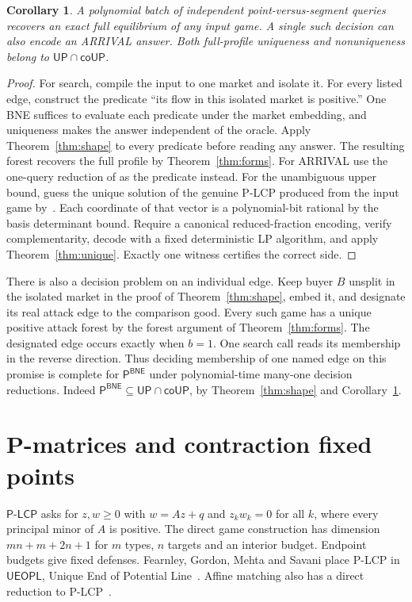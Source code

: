 \documentclass[11pt,oneside,openany,notitlepage]{report}
\newtheorem{corollary}[theorem]{Corollary}
\newcommand{\BNE}{\mathsf{BNE}}
\newcommand{\PLCP}{\mathsf{P\mbox{-}LCP}}
\begin{document}
\begin{corollary}\label{cor:batch}
A polynomial batch of independent point-versus-segment queries recovers
an exact full equilibrium of any input game. A single such decision can
also encode an ARRIVAL answer. Both full-profile uniqueness and
nonuniqueness belong to \(\mathsf{UP}\cap\mathsf{coUP}\).
\end{corollary}
\begin{proof}
For search, compile the input to one market and isolate it. For every
listed edge, construct the predicate ``its flow in this isolated market
is positive.'' One BNE suffices to evaluate each predicate under the
market embedding, and uniqueness makes the answer independent of the
oracle. Apply Theorem~\ref{thm:shape} to every predicate before reading
any answer. The resulting forest recovers the full profile by
Theorem~\ref{thm:forms}. For ARRIVAL use the one-query reduction of
\cite[Theorem~4.1]{book} as the predicate instead. For the unambiguous
upper bound, guess the unique solution of the genuine P-LCP produced
from the input game by~\cite[Theorem~5.19]{book}. Each coordinate of that
vector is a polynomial-bit rational by the basis determinant bound.
Require a canonical reduced-fraction encoding, verify complementarity,
decode with a fixed deterministic LP algorithm, and apply
Theorem~\ref{thm:unique}. Exactly one witness certifies the correct side.
\end{proof}

There is also a decision problem on an individual edge. Keep buyer \(B\)
unsplit in the isolated market in the proof of Theorem~\ref{thm:shape},
embed it, and designate its real attack edge to the comparison good.
Every such game has a unique positive attack forest by the forest argument
of Theorem~\ref{thm:forms}. The designated edge occurs exactly when
\(b=1\). One search call reads its membership in the reverse direction.
Thus deciding membership of one named edge on this promise is complete
for \(\mathsf P^{\BNE}\) under polynomial-time many-one decision reductions.
Indeed \(\mathsf P^{\BNE}\subseteq\mathsf{UP}\cap\mathsf{coUP}\), by
Theorem~\ref{thm:shape} and Corollary~\ref{cor:batch}.

\chapter{P-matrices and contraction fixed points}\label{sec:upper}

\(\PLCP\) asks for \(z,w\ge0\) with \(w=Az+q\) and \(z_kw_k=0\) for all
\(k\), where every principal minor of \(A\) is positive. The direct
game construction has dimension \(mn+m+2n+1\) for \(m\) types, \(n\)
targets and an interior budget. Endpoint budgets give fixed defenses.
Fearnley, Gordon, Mehta and Savani place P-LCP in \(\mathsf{UEOPL}\),
Unique End of Potential Line~\cite{fgms}. Affine matching also has a
direct reduction to P-LCP~\cite[Theorem~5.6]{book}.
\end{document}
